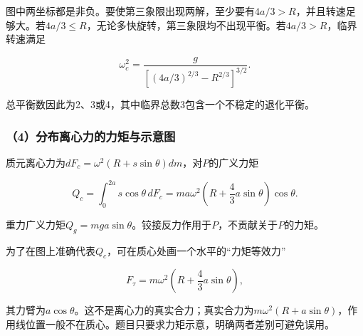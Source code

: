 \documentclass[12pt,a4paper,fontset=fandol]{ctexart}
\begin{document}
\begin{center}
\begin{minipage}{\linewidth}
\centering\begingroup{}
\ifdim\wd\diagrambox>.88\linewidth
\sbox{\diagrambox}{\resizebox{.88\linewidth}{!}{\usebox{\diagrambox}}}\fi
\ifdim\ht\diagrambox>.38\textheight
\resizebox{!}{.38\textheight}{\usebox{\diagrambox}}
\else\usebox{\diagrambox}\fi
\par{}\endgroup\end{minipage}\end{center}

图中两坐标都是非负。要使第三象限出现两解，至少要有\(4a/3>R\)，并且转速足够大。若\(4a/3\leq R\)，无论多快旋转，第三象限均不出现平衡。若\(4a/3>R\)，临界转速满足

\[
\omega_c^2=
\frac{g}{[(4a/3)^{2/3}-R^{2/3}]^{3/2}}.
\]

总平衡数因此为2、3或4，其中临界总数3包含一个不稳定的退化平衡。

\subsubsection{（4）分布离心力的力矩与示意图}\label{ux5206ux5e03ux79bbux5fc3ux529bux7684ux529bux77e9ux4e0eux793aux610fux56fe}

质元离心力为\(dF_c=\omega^2(R+s\sin\theta)dm\)，对\(P\)的广义力矩

\[
Q_c=\int_0^{2a}s\cos\theta\,dF_c
=ma\omega^2\left(R+\frac43a\sin\theta\right)\cos\theta.
\]

重力广义力矩\(Q_g=mga\sin\theta\)。铰接反力作用于\(P\)，不贡献关于\(P\)的力矩。

为了在图上准确代表\(Q_c\)，可在质心处画一个水平的``力矩等效力''

\[
F_\tau=m\omega^2\left(R+\frac43a\sin\theta\right),
\]

其力臂为\(a\cos\theta\)。这不是离心力的真实合力；真实合力为\(m\omega^2(R+a\sin\theta)\)，作用线位置一般不在质心。题目只要求力矩示意，明确两者差别可避免误用。
\end{document}
